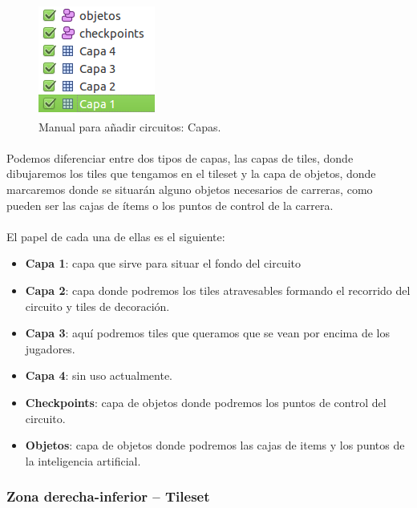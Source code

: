 \begin{figure}[H]
  \label{capas}
  \begin{center}
    \includegraphics[scale=1]{imagenes/manualcircuito/capas.png}
  \end{center}
  \caption{Manual para añadir circuitos: Capas.}
\end{figure}

\paragraph{}
Podemos diferenciar entre dos tipos de capas, las capas de tiles, donde dibujaremos los tiles que tengamos en el tileset y la 
capa de objetos, donde marcaremos donde se situarán alguno objetos necesarios
de carreras, como pueden ser las cajas de ítems
o los puntos de control de la carrera.

\paragraph{}
El papel de cada una de ellas es el siguiente:

\begin{itemize}
    \item \textbf{Capa 1}: capa que sirve para situar el fondo del circuito
    \item \textbf{Capa 2}: capa donde podremos los tiles atravesables formando el recorrido del circuito y tiles de decoración.
    \item \textbf{Capa 3}: aquí podremos tiles que queramos que se vean por encima de los jugadores.
    \item \textbf{Capa 4}: sin uso actualmente.
    \item \textbf{Checkpoints}: capa de objetos donde podremos los puntos de control del circuito.
    \item \textbf{Objetos}: capa de objetos donde podremos las cajas de items y los puntos de la inteligencia artificial.
\end{itemize}

\subsubsection{Zona derecha-inferior -- Tileset}

